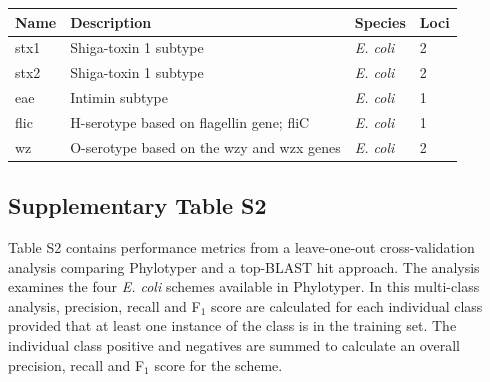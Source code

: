\documentclass[12pt,letterpaper]{article}
\begin{document}
\begin{minipage}{\linewidth}
\medskip
\begin{tabular}{@{}llll@{}}\toprule Name &
Description & Species & Loci\\\midrule
stx1 & Shiga-toxin 1 subtype & {\it E. coli} & 2 \\
stx2 & Shiga-toxin 1 subtype & {\it E. coli} & 2\\
eae & Intimin subtype & {\it E. coli} & 1\\
flic & H-serotype based on flagellin gene; fliC & {\it E. coli} & 1\\
wz & O-serotype based on the wzy and wzx genes & {\it E. coli} & 2\\\bottomrule
\end{tabular}\par
\bigskip

\end{minipage}

\bigskip

\subsection{Supplementary Table S2}

Table S2 contains performance metrics from a leave-one-out cross-validation analysis comparing Phylotyper and a top-BLAST hit approach.  The analysis examines the four \textit{E. coli} schemes available in Phylotyper. In this multi-class analysis, precision, recall and F$_{1}$ score are calculated for each individual class provided that at least one instance of the class is in the training set.  The individual class positive and negatives are summed to calculate an overall precision, recall and F$_{1}$ score for the scheme.
\end{document}
